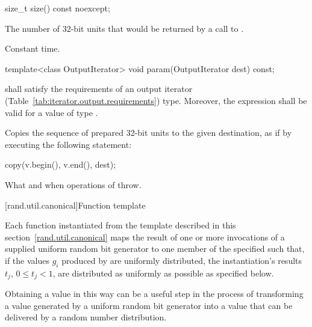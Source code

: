 %
\begin{itemdecl}
size_t size() const noexcept;
\end{itemdecl}

\begin{itemdescr}
\pnum\returns The number of 32-bit units
 that would be returned
 by a call to .

\pnum\complexity Constant time.
\end{itemdescr}

%
\begin{itemdecl}
template<class OutputIterator>
  void param(OutputIterator dest) const;
\end{itemdecl}

\begin{itemdescr}
\pnum\requires
   shall satisfy the requirements
  of an output iterator (Table~\ref{tab:iterator.output.requirements}) type.
  Moreover,
  the expression
  shall be valid for a value  of type .

\pnum\effects Copies the sequence of prepared 32-bit units
 to the given destination,
 as if by executing the following statement:
\begin{codeblock}
copy(v.begin(), v.end(), dest);
\end{codeblock}

\pnum\throws
What and when  operations of  throw.
\end{itemdescr}


[rand.util.canonical]{Function template }%
%

\pnum
 Each function instantiated
 from the template
 described in this section~\ref{rand.util.canonical}
 maps the result of one or more invocations
 of a supplied uniform random bit generator 
 to one member
 of the specified 
 such that,
 if the values $g_i$
 produced by 
 are uniformly distributed,
 the instantiation's results
 $t_j$, $ 0 \leq t_j < 1 $,
 are distributed as uniformly as possible
 as specified below.

\pnum
\begin{note}
 Obtaining a value in this way
 can be a useful step
 in the process of transforming
 a value generated by a uniform random bit generator
 into a value
 that can be delivered by a random number distribution.
\end{note}

